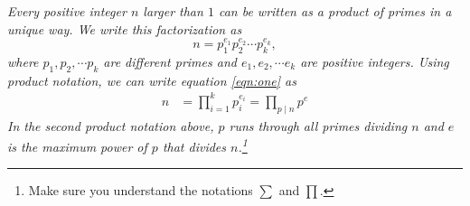 \documentclass{subfile}
\begin{document}
	\begin{theorem}\slshape
		Every positive integer $n$ larger than $1$ can be written as a product of primes \textit{in a unique way}. We write this factorization as
		\begin{equation}
			n=p_1^{e_1}p_2^{e_2}\cdots p_k^{e_k},\label{eqn:one}
		\end{equation}
		where $p_1,p_2,\cdots p_k$ are different primes and $e_1,e_2,\cdots e_k$ are positive integers. Using product notation, we can write equation \eqref{eqn:one} as
		\begin{align*}
			n
				&=\prod\limits_{i=1}^{k}p_i^{e_i}=\prod\limits_{p\mid n}p^e
		\end{align*}
		In the second product notation above, $p$ runs through all primes dividing $n$ and $e$ is the maximum power of $p$ that divides $n$.\footnote{Make sure you understand the notations $\sum$ and $\prod$.}
	\end{theorem}
\end{document}
